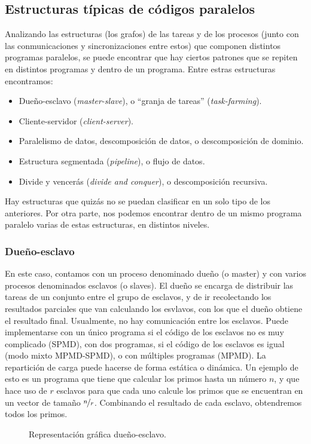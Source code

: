 \subsection{Estructuras típicas de códigos paralelos}
Analizando las estructuras (los grafos) de las tareas y de los procesos (junto con las conmunicaciones y sincronizaciones entre estos) que componen distintos programas paralelos, se puede encontrar que hay ciertos patrones que se repiten en distintos programas y dentro de un programa. Entre estras estructuras encontramos:
\begin{itemize}
    \item Dueño-esclavo (\emph{master-slave}), o ``granja de tareas'' (\emph{task-farming}).
    \item Cliente-servidor (\emph{client-server}).
    \item Paralelismo de datos, descomposición de datos, o descomposición de dominio. 
    \item Estructura segmentada (\emph{pipeline}), o flujo de datos.
    \item Divide y vencerás (\emph{divide and conquer}), o descomposición recursiva. 
\end{itemize}
Hay estructuras que quizás no se puedan clasificar en un solo tipo de los anteriores. Por otra parte, nos podemos encontrar dentro de un mismo programa paralelo varias de estas estructuras, en distintos niveles.

\subsubsection{Dueño-esclavo} 
En este caso, contamos con un proceso denominado dueño (o master) y con varios procesos denominados esclavos (o slaves). El dueño se encarga de distribuir las tareas de un conjunto entre el grupo de esclavos, y de ir recolectando los resultados parciales que van calculando los esvlavos, con los que el dueño obtiene el resultado final. Usualmente, no hay comunicación entre los esclavos.
Puede implementarse con un único programa si el código de los esclavos no es muy complicado (SPMD), con dos programas, si el código de los esclavos es igual (modo mixto MPMD-SPMD), o con múltiples programas (MPMD).
La repartición de carga puede hacerse de forma estática o dinámica.
Un ejemplo de esto es un programa que tiene que calcular los primos hasta un número $n$, y que hace uso de $r$ esclavos para que cada uno calcule los primos que se encuentran en un vector de tamaño $ \nicefrac{n}{r} $. Combinando el resultado de cada esclavo, obtendremos todos los primos.
\begin{figure}[H]
\centering
{}
\caption{Representación gráfica dueño-esclavo.}
\label{graph:dueno_esclavo}
\end{figure}


